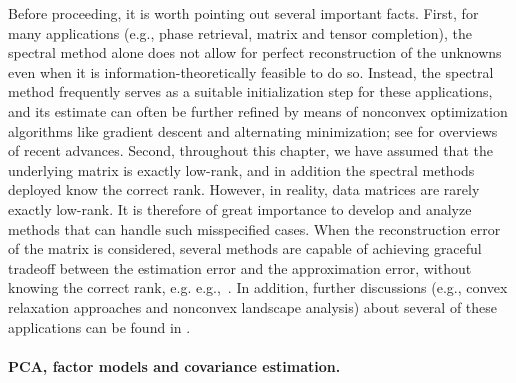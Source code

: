 Before proceeding, it is worth pointing out several important facts. First, for many applications (e.g., phase retrieval, matrix and tensor completion), the spectral method alone does not allow for perfect reconstruction of the unknowns even when it is information-theoretically feasible to do so.  Instead, the spectral method frequently serves as a suitable initialization step for these applications, and its estimate can often be further refined by means of nonconvex optimization algorithms like gradient descent and alternating minimization; see \citet{chi2019nonconvex,jain2017non} for overviews of recent advances.
Second, throughout this chapter, we have assumed that the underlying matrix is exactly low-rank, and in addition the spectral methods deployed know the correct rank. However, in reality, data matrices are rarely exactly low-rank. It is therefore of great importance to develop and analyze methods that can handle such misspecified cases. When the reconstruction error of the matrix is considered, several methods are capable of achieving graceful tradeoff between the estimation error and the approximation error, without knowing the correct rank, e.g. e.g.,~\citet{koltchinskii2011nuclear,chatterjee2014universal,negahban2011estimation}. 
In addition, further discussions (e.g., convex relaxation approaches and nonconvex landscape analysis) about several of these applications can be found in \citet{candes2014mathematics,wainwright2019high,wright2020high,zhang2020symmetry}.








\paragraph{PCA, factor models and covariance estimation.}

